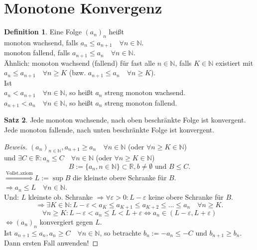 \documentclass[12pt,a4paper,titlepage]{article} %
\theoremstyle{definition}
\newtheorem{satz}{Satz}[subsection]
\newtheorem{defi}[satz]{Definition}
\theoremstyle{remark}
\newenvironment{bew}{\begin{proof}[Beweis]}{\end{proof}}
\newcommand{\N}{\mathbb{N}}
\newcommand{\R}{\mathbb{R}}
\begin{document}
\section{Monotone Konvergenz}
\begin{defi}
	Eine Folge \((a_n)_n\) heißt \\monoton wachsend, falls \(a_n\leq a_{n+1} \quad \forall n\in\N \).\\monoton fallend, falls \(a_{n+1} \leq a_n \quad\forall n\in\N \).\\
	Ähnlich: monoton wachsend (fallend) für fast alle \(n\in\N\), falls \( K\in\N \) existiert mit \( a_n\leq a_{n+1} \quad \forall n\geq K \) (bzw. \(a_{n+1}\leq a_n \quad \forall n\geq K \)).\\
	Ist \\\( a_n<a_{n+1} \quad \forall n\in\N \), so heißt \(a_n\) streng monoton wachsend.\\
	\( a_{n+1}<a_n \quad \forall n\in\N \), so heißt \(a_n\) streng monoton fallend.
\end{defi}
\begin{satz}
	Jede monoton wachsende, nach oben beschränkte Folge ist konvergent. Jede monoton fallende, nach unten beschränkte Folge ist konvergent.
\end{satz}
\begin{bew}
	\((a_n)_{n\in\N}, a_{n+1} \geq a_n \quad \forall n\in\N \) (oder \( \forall n\geq K \in\N \))\\
	und \( \exists C\in\R: a_n \leq C \quad \forall n\in\N \) (oder \( \forall n\geq K \in\N \))\\
	\[ B:= \{a_n, n\in\N\} \subset \R, b\neq \emptyset \text{ und } B\leq C. \]
	\(\overset{\text{Vollst.axiom}}{\Rightarrow} L := \sup B\) die kleinste obere Schranke für \(B\).\\
	\(\Rightarrow a_n \leq L \quad \forall n\in\N \).\\
	Und: \(L\) kleinste ob. Schranke \( \Rightarrow \forall \varepsilon>0: L-\varepsilon \) keine obere Schranke für \(B\).\\
	\[ \Rightarrow \exists K \in\N: L-\varepsilon < a_K \leq a_{K+1} \leq a_{K+2} \leq \ldots \leq a_n \quad \forall n\geq K. \]
	\[ \forall n\geq K: L-\varepsilon < a_n \leq L < L + \varepsilon \Leftrightarrow a_n \in (L-\varepsilon, L + \varepsilon) \]
	\( \Leftrightarrow (a_n)_n \) konvergiert gegen \(L\).\\
	Ist \(a_{n+1} \leq a_n, a_n\geq C \quad \forall n\in\N \), so betrachte \(b_n := -a_n \leq -C \) und \(b_{n+1} \geq b_n\). Dann ersten Fall anwenden!
\end{bew}
\end{document}
